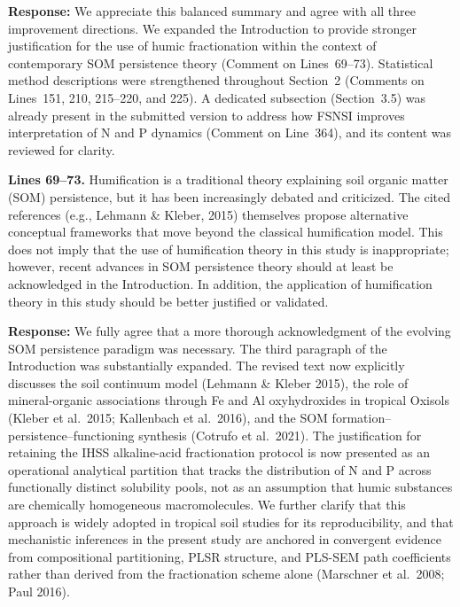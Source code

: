\documentclass[11pt,a4paper]{article}
\newcommand{\response}[1]{\par\noindent\textcolor{responsecolor}{\textbf{Response:}} #1}
\begin{document}
\response{We appreciate this balanced summary and agree with all three improvement directions. We expanded the Introduction to provide stronger justification for the use of humic fractionation within the context of contemporary SOM persistence theory (Comment on Lines~69--73). Statistical method descriptions were strengthened throughout Section~2 (Comments on Lines~151, 210, 215--220, and 225). A dedicated subsection (Section~3.5) was already present in the submitted version to address how FSNSI improves interpretation of N and P dynamics (Comment on Line~364), and its content was reviewed for clarity.}

\bigskip


\begin{reviewerbox}
\textbf{Lines 69--73.} Humification is a traditional theory explaining soil organic matter (SOM) persistence, but it has been increasingly debated and criticized. The cited references (e.g., Lehmann \& Kleber, 2015) themselves propose alternative conceptual frameworks that move beyond the classical humification model. This does not imply that the use of humification theory in this study is inappropriate; however, recent advances in SOM persistence theory should at least be acknowledged in the Introduction. In addition, the application of humification theory in this study should be better justified or validated.
\end{reviewerbox}

\response{We fully agree that a more thorough acknowledgment of the evolving SOM persistence paradigm was necessary. The third paragraph of the Introduction was substantially expanded. The revised text now explicitly discusses the soil continuum model (Lehmann \& Kleber 2015), the role of mineral-organic associations through Fe and Al oxyhydroxides in tropical Oxisols (Kleber et al.\ 2015; Kallenbach et al.\ 2016), and the SOM formation--persistence--functioning synthesis (Cotrufo et al.\ 2021). The justification for retaining the IHSS alkaline-acid fractionation protocol is now presented as an operational analytical partition that tracks the distribution of N and P across functionally distinct solubility pools, not as an assumption that humic substances are chemically homogeneous macromolecules. We further clarify that this approach is widely adopted in tropical soil studies for its reproducibility, and that mechanistic inferences in the present study are anchored in convergent evidence from compositional partitioning, PLSR structure, and PLS-SEM path coefficients rather than derived from the fractionation scheme alone (Marschner et al.\ 2008; Paul 2016).}
\end{document}
